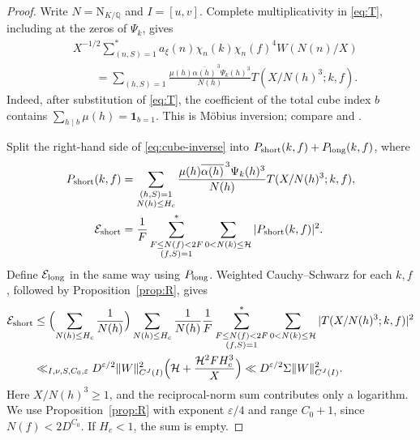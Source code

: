 \documentclass[11pt,a4paper]{article}
\numberwithin{equation}{section}
\numberwithin{figure}{section}
\theoremstyle{definition}
\theoremstyle{remark}
\newcommand{\Q}{\mathbb Q}
\newcommand{\NK}{\mathrm N_{K/\Q}}
\newcommand{\E}{\mathcal E}
\newcommand{\ind}{\mathbf1}
\begin{document}
\begin{proof}
Write $N=\NK$ and $I=[u,v]$. Complete multiplicativity in
\eqref{eq:T}, including at the zeros of $\Psi_k$, gives
\begin{equation}\label{eq:cube-inverse}
 \begin{aligned}
 &X^{-1/2}\sum_{(n,S)=1}^*a_\xi(n)\chi_n(k)\chi_n(f)^4
 W(N(n)/X)\\
 &\qquad=\sum_{(h,S)=1}
 \frac{\mu(h)\overline{\alpha(h)}^{\,3}\Psi_k(h)^3}{N(h)}
 T(X/N(h)^3;k,f).
 \end{aligned}
\end{equation}
Indeed, after substitution of \eqref{eq:T}, the coefficient of the
total cube index $b$ contains
$\sum_{h\mid b}\mu(h)=\ind_{b=1}$.
This is M\"obius inversion; compare \cite[(1.18)]{IK04} and
\cite[(8.2)]{DR}.

Split the right-hand side of \eqref{eq:cube-inverse} into
$P_{\rm short}(k,f)+P_{\rm long}(k,f)$, where
\[
 \begin{aligned}
 P_{\rm short}(k,f)&=
 \sum_{\substack{(h,S)=1\\N(h)\le H_c}}
 \frac{\mu(h)\overline{\alpha(h)}^{\,3}\Psi_k(h)^3}{N(h)}
 T(X/N(h)^3;k,f),\\
 \E_{\rm short}&=\frac1F\sum_{\substack{F\le N(f)<2F\\(f,S)=1}}^*
 \sum_{0<N(k)\le\mathcal H}|P_{\rm short}(k,f)|^2.
 \end{aligned}
\]
Define $\E_{\rm long}$ in the same way using $P_{\rm long}$.
Weighted Cauchy--Schwarz for each $k,f$, followed by
Proposition~\ref{prop:R}, gives
\begin{equation}\label{eq:short-cube-bound}
 \begin{aligned}
 \E_{\rm short}
 &\le\Bigl(\sum_{N(h)\le H_c}\frac1{N(h)}\Bigr)
 \sum_{N(h)\le H_c}\frac1{N(h)} \frac1F\sum_{\substack{F\le N(f)<2F\\(f,S)=1}}^*
 \sum_{0<N(k)\le\mathcal H}|T(X/N(h)^3;k,f)|^2\\
 &\ll_{I,\nu,S,C_0,\varepsilon}
 D^{\varepsilon/2}\|W\|_{C^J(I)}^2
 \Bigl(\mathcal H+\frac{\mathcal H^2FH_c^3}{X}\Bigr)
 \ll D^{\varepsilon/2}\Sigma\|W\|_{C^J(I)}^2.
 \end{aligned}
\end{equation}
Here $X/N(h)^3\ge1$, and the reciprocal-norm sum contributes
only a logarithm. We use Proposition~\ref{prop:R} with exponent
$\varepsilon/4$ and range $C_0+1$, since $N(f)<2D^{C_0}$.
If $H_c<1$, the sum is empty.


\end{proof}
\end{document}
